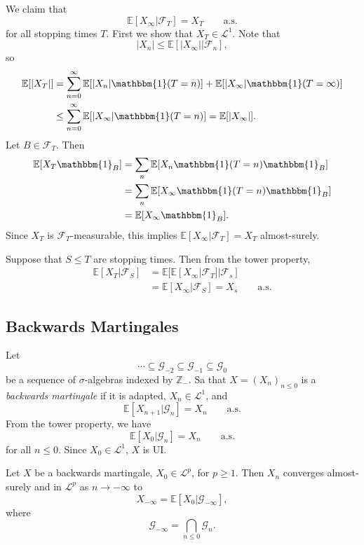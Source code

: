 \documentclass[12pt]{article}
\begin{document}
\begin{proofbox}
	We claim that
	\[
		\mathbb{E}[X_\infty | \mathcal{F}_T] = X_T \qquad \text{a.s.}
	\]
	for all stopping times $T$. First we show that $X_T \in \mathcal{L}^1$. Note that
	\[
	|X_n| \leq \mathbb{E}[|X_\infty| | \mathcal{F}_n],
	\]
	so
	\begin{align*}
		\mathbb{E}[|X_T|] &= \sum_{n = 0}^{\infty} \mathbb{E}[|X_n| \mathbbm{1}(T=n)] + \mathbb{E}[|X_\infty| \mathbbm{1}(T = \infty)] \\
				  &\leq \sum_{n = 0}^{\infty} \mathbb{E}[|X_\infty| \mathbbm{1}(T=n)] = \mathbb{E}[|X_\infty|].
	\end{align*}
	Let $B \in \mathcal{F}_T$. Then
	\begin{align*}
		\mathbb{E}[X_T \mathbbm{1}_{B}] &= \sum_n \mathbb{E}[X_n \mathbbm{1}(T = n) \mathbbm{1}_{B}] \\
						&= \sum_n \mathbb{E}[X_\infty \mathbbm{1}(T = n) \mathbbm{1}_{B}] \\
						&= \mathbb{E}[X_\infty \mathbbm{1}_{B}].
	\end{align*}
	Since $X_T$ is $\mathcal{F}_T$-measurable, this implies $\mathbb{E}[X_\infty | \mathcal{F}_T] = X_T$ almost-surely.

	Suppose that $S \leq T$ are stopping times. Then from the tower property,
	\begin{align*}
		\mathbb{E}[X_T |\mathcal{F}_S] &= \mathbb{E}[ \mathbb{E}[X_\infty | \mathcal{F}_T] | \mathcal{F}_s] \\
					       &= \mathbb{E}[X_\infty | \mathcal{F}_S] = X_s \qquad \text{a.s.}
	\end{align*}
\end{proofbox}

\subsection{Backwards Martingales}%
\label{sub:bms}

Let
\[
\cdots \subseteq \mathcal{G}_{-2} \subseteq \mathcal{G}_{-1} \subseteq \mathcal{G}_0
\]
be a sequence of $\sigma$-algebras indexed by $\mathbb{Z}_-$. Sa that $X = (X_n)_{n \leq 0}$ is a \emph{backwards martingale} if it is adapted, $X_n \in \mathcal{L}^1$, and
\[
	\mathbb{E}[X_{n+1} | \mathcal{G}_n] = X_n \qquad \text{a.s.}
\]
From the tower property, we have
\[
	\mathbb{E}[X_0 | \mathcal{G}_n] = X_n \qquad \text{a.s.}
\]
for all $n \leq 0$. Since $X_0 \in \mathcal{L^1}$, $X$ is UI.

\begin{theorem}
	Let $X$ be a backwards martingale, $X_0 \in \mathcal{L}^p$, for $p \geq 1$. Then $X_n$ converges almost-surely and in $\mathcal{L}^p$ as $n \to -\infty$ to
	\[
	X_{-\infty} = \mathbb{E}[X_0 | \mathcal{G}_{-\infty}],
	\]
	where
	\[
	\mathcal{G}_{-\infty} = \bigcap_{n \leq 0} \mathcal{G}_n.
	\]
\end{theorem}
\end{document}
